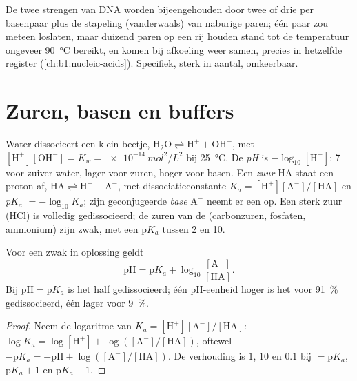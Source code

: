 \begin{example}\label{ex:b1:water-small-molecules:melting}
De twee strengen van DNA worden bijeengehouden door twee of drie
 per basenpaar plus de stapeling (vanderwaals) van naburige
paren; één paar zou meteen loslaten, maar duizend paren op een rij houden stand
tot de temperatuur ongeveer \qty{90}{\celsius} bereikt, en komen bij afkoeling
weer samen, precies in hetzelfde register
(\cref{ch:b1:nucleic-acids}). Specifiek, sterk in aantal, omkeerbaar.
\end{example}

\section{Zuren, basen en buffers}

\begin{definition}\label{def:b1:water-small-molecules:ph}
Water dissocieert een klein beetje, $\mathrm{H_2O} \rightleftharpoons
\mathrm{H^+} + \mathrm{OH^-}$, met $[\mathrm{H^+}][\mathrm{OH^-}] =
K_w = \qty{e-14}{mol^2/L^2}$ bij \qty{25}{\celsius}. De
\emph{pH} is $-\log_{10}[\mathrm{H^+}]$: 7 voor zuiver water, lager
voor zuren, hoger voor basen. Een \emph{zuur} $\mathrm{HA}$ staat een
proton af, $\mathrm{HA} \rightleftharpoons \mathrm{H^+} +
\mathrm{A^-}$, met dissociatieconstante $K_a =
[\mathrm{H^+}][\mathrm{A^-}]/[\mathrm{HA}]$ en
\emph{p$K_a$} $= -\log_{10}K_a$; zijn geconjugeerde
\emph{base} $\mathrm{A^-}$ neemt er een op. Een sterk zuur (HCl) is
volledig gedissocieerd; de zuren van de  (carbonzuren, fosfaten, ammonium)
zijn zwak, met een p$K_a$ tussen 2 en 10.
\end{definition}

\begin{theorem}\label{thm:b1:water-small-molecules:hh}
Voor een zwak  in oplossing geldt
\[
\mathrm{pH} = \mathrm{p}K_a + \log_{10}\frac{[\mathrm{A^-}]}{[\mathrm{HA}]} .
\]
Bij $\mathrm{pH} = \mathrm{p}K_a$ is het  half gedissocieerd; één pH-eenheid
hoger is het voor \qty{91}{\%} gedissocieerd, één lager voor \qty{9}{\%}.
\end{theorem}
\begin{proof}
Neem de logaritme van $K_a = [\mathrm{H^+}][\mathrm{A^-}]/[\mathrm{HA}]$:
$\log K_a = \log[\mathrm{H^+}] + \log([\mathrm{A^-}]/[\mathrm{HA}])$,
oftewel $-\mathrm{p}K_a = -\mathrm{pH} + \log([\mathrm{A^-}]/[\mathrm{HA}])$.
De verhouding is $1$, $10$ en $0.1$ bij  $= \mathrm{p}K_a$, $\mathrm{p}K_a + 1$
en $\mathrm{p}K_a - 1$.
\end{proof}

